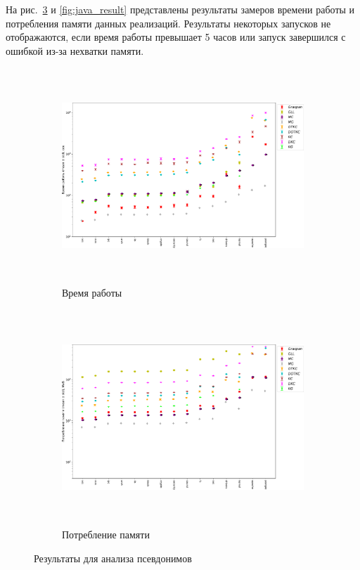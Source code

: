 На рис.~\ref{fig:ma_result} и \ref{fig:java_result} представлены результаты замеров времени работы и потребления памяти данных реализаций. Результаты некоторых запусков не отображаются, если время работы превышает 5 часов или запуск завершился с ошибкой из-за нехватки памяти. 
\begin{figure}[h!]
    \begin{subfigure}{\textwidth}
        \centering
        \includegraphics[width=\linewidth, height=8.1cm]{figures/ma_time.pdf}
        \caption{Время работы}
        \label{fig:ma_result_time}
    \end{subfigure}
    \begin{subfigure}{\textwidth}
        \centering
        \includegraphics[width=\linewidth, height=8.1cm]{figures/ma_mem.pdf}
        \caption{Потребление памяти}
        \label{fig:ma_result_mem}
    \end{subfigure}
    \caption{Результаты для анализа псевдонимов}
    \label{fig:ma_result}
\end{figure}

